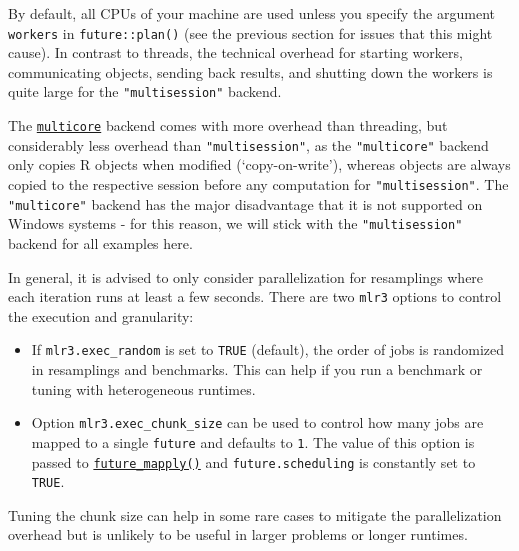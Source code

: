 By default, all CPUs of your machine are used unless you specify the
argument \texttt{workers} in \texttt{future::plan()} (see the previous
section for issues that this might cause). In contrast to threads, the
technical overhead for starting workers, communicating objects, sending
back results, and shutting down the workers is quite large for the
\texttt{"multisession"} backend.

The
\href{https://www.rdocumentation.org/packages/future/topics/multicore}{\texttt{multicore}}
backend comes with more overhead than threading, but considerably less
overhead than \texttt{"multisession"}, as the \texttt{"multicore"}
backend only copies R objects when modified (`copy-on-write'), whereas
objects are always copied to the respective session before any
computation for \texttt{"multisession"}. The \texttt{"multicore"}
backend has the major disadvantage that it is not supported on Windows
systems - for this reason, we will stick with the
\texttt{"multisession"} backend for all examples here.

In general, it is advised to only consider parallelization for
resamplings where each iteration runs at least a few seconds. There are
two \texttt{mlr3} options to control the execution and granularity:

\begin{itemize}
\tightlist
\item
  If \texttt{mlr3.exec\_random} is set to \texttt{TRUE} (default), the
  order of jobs is randomized in resamplings and benchmarks. This can
  help if you run a benchmark or tuning with heterogeneous runtimes.
\item
  Option \texttt{mlr3.exec\_chunk\_size} can be used to control how many
  jobs are mapped to a single \texttt{future} and defaults to
  \texttt{1}. The value of this option is passed to
  \href{https://www.rdocumentation.org/packages/future.apply/topics/future_mapply}{\texttt{future\_mapply()}}
  and \texttt{future.scheduling} is constantly set to \texttt{TRUE}.
\end{itemize}

Tuning the chunk size can help in some rare cases to mitigate the
parallelization overhead but is unlikely to be useful in larger problems
or longer runtimes.

